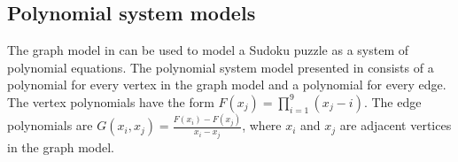 \subsection{Polynomial system models}
\label{sec:models:polynomials}

The graph model in \cite{gagovargaset} can be used to model a Sudoku puzzle as a system of polynomial equations. The polynomial system model presented in \cite{gagovargaset} consists of a polynomial for every vertex in the graph model and a polynomial for every edge. The vertex polynomials have the form $F(x_j) = \prod_{i=1}^{9} (x_j - i)$. The edge polynomials are $G(x_i, x_j) = \frac{F(x_i) - F(x_j)}{x_i - x_j}$, where $x_i$ and $x_j$ are adjacent vertices in the graph model. 

